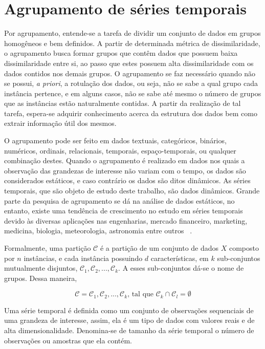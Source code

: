 \chapter{Agrupamento de séries temporais} \label{cap:agrupamento_series_temporais}

Por agrupamento, entende-se a tarefa de dividir um conjunto de dados em grupos homogêneos e bem definidos. A partir de determinada métrica de dissimilaridade, o agrupamento busca formar grupos que contêm dados que possuem baixa dissimilaridade entre si, ao passo que estes possuem alta dissimilaridade com os dados contidos nos demais grupos. O agrupamento se faz necessário quando não se possui, \emph{a priori}, a rotulação dos dados, ou seja, não se sabe a qual grupo cada instância pertence, e em alguns casos, não se sabe até mesmo o número de grupos que as instâncias estão naturalmente contidas. A partir da realização de tal tarefa, espera-se adquirir conhecimento acerca da estrutura dos dados bem como extrair informação útil dos mesmos.

O agrupamento pode ser feito em dados textuais, categóricos, binários, numéricos, ordinais, relacionais, temporais, espaço-temporais, ou qualquer combinação destes. Quando o agrupamento é realizado em dados nos quais a observação das grandezas de interesse não variam com o tempo, os dados são considerados estáticos, e caso contrário os dados são ditos dinâmicos. As séries temporais, que são objeto de estudo deste trabalho, são dados dinâmicos. Grande parte da pesquisa de agrupamento se dá na análise de dados estáticos, no entanto, existe uma tendência de crescimento no estudo em séries temporais devido às diversas aplicações nas engenharias, mercado financeiro, marketing, medicina, biologia, meteorologia, astronomia entre outros ~\parencite{Liao}.

Formalmente, uma partição $\mathcal{C}$ é a partição de um conjunto de dados $X$ composto por $n$ instâncias, e cada instância possuindo $d$ características, em $k$ sub-conjuntos mutualmente disjuntos, $\mathcal{C}_1,\mathcal{C}_2,...,\mathcal{C}_k$. A esses sub-conjuntos dá-se o nome de grupos. Dessa maneira,

\begin{equation}
\mathcal{C} = {\mathcal{C}_1,\mathcal{C}_2,...,\mathcal{C}_k} \text{,  tal que } \mathcal{C}_k \cap \mathcal{C}_l = \emptyset
\end{equation}

Uma série temporal é definida como um conjunto de observações sequenciais de uma grandeza de interesse, assim, ela é um tipo de dados com valores reais e de alta dimensionalidade. Denomina-se de tamanho da série temporal o número de observações ou amostras que ela contém.

